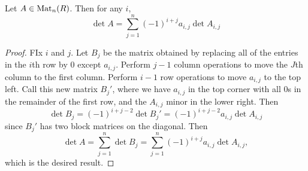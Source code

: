 \begin{prop}
  Let $A \in \operatorname{Mat}_n(R)$. Then for any $i$,
  \[
    \det A = \sum_{j = 1}^n (-1)^{i + j} a_{i, j} \det A_{i, j}
  \]
\end{prop}

\begin{proof}
  FIx $i$ and $j$. Let $B_j$ be the matrix obtained by
  replacing all of the entries in the $i$th row
  by $0$ except $a_{i, j}$. Perform $j - 1$ column
  operations to move the $J$th column to the first
  column. Perform $i - 1$ row operations to move
  $a_{i, j}$ to the top left. Call this new matrix
  $B_j'$, where we have $a_{i, j}$ in the top corner
  with all $0$s in the remainder of the first row,
  and the $A_{i, j}$ minor in the lower right. Then
  \[
    \det B_j = (-1)^{i + j - 2} \det B_j'
    = (-1)^{i + j - 2} a_{i, j} \det A_{i, j}
  \]
  since $B_j'$ has two block matrices on the diagonal.
  Then
  \[
    \det A = \sum_{j = 1}^n \det B_j
    = \sum_{j = 1}^n (-1)^{i + j} a_{i, j} \det A_{i, j},
  \]
  which is the desired result.
\end{proof}
